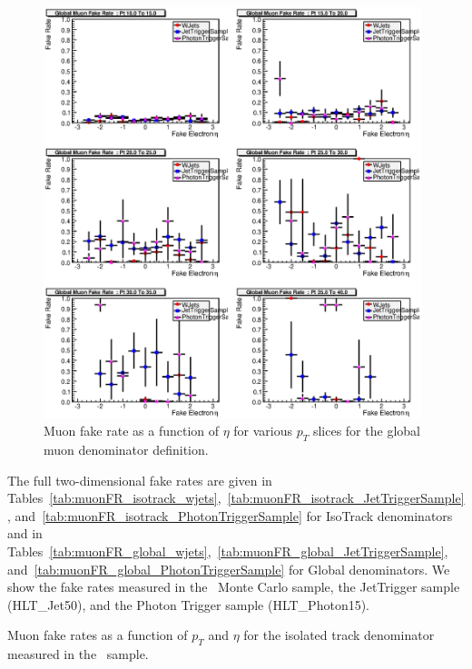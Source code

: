 \documentclass{cmspaper}
\begin{document}
\begin{figure}[htb]
\begin{center}
\includegraphics[width=0.98\textwidth]{plots/GlobalMuonFakeRatePtSlices.eps}
   \caption{Muon fake rate as a function of $\eta$ for various $p_T$ slices for the global muon denominator definition. }
   \label{fig:muonFR_global_ptslices}
\end{center}
\end{figure}

The full two-dimensional fake rates are given in Tables~\ref{tab:muonFR_isotrack_wjets},~\ref{tab:muonFR_isotrack_JetTriggerSample}, and~\ref{tab:muonFR_isotrack_PhotonTriggerSample} for IsoTrack denominators and in Tables~\ref{tab:muonFR_global_wjets},~\ref{tab:muonFR_global_JetTriggerSample}, and~\ref{tab:muonFR_global_PhotonTriggerSample} for Global denominators. We show the fake rates measured in the \WPlusJets\ Monte Carlo sample, the JetTrigger sample (HLT\_Jet50), and the Photon Trigger sample (HLT\_Photon15).

\begin{table}[ht]
  \begin{center}
    
  \end{center}
  \caption{\label{tab:muonFR_isotrack_wjets} Muon fake rates as a function of $p_T$ and $\eta$ for the isolated track denominator measured in the \WPlusJets\ sample.}
\end{table}
\end{document}
